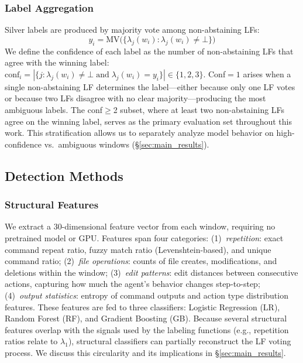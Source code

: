 \subsubsection{Label Aggregation}
\label{sec:label_aggregation}

Silver labels are produced by majority vote among non-abstaining LFs:
\begin{equation}
y_i = \text{MV}\bigl(\{\lambda_j(w_i) : \lambda_j(w_i) \neq \bot\}\bigr)
\label{eq:mv}
\end{equation}
We define the confidence of each label as the number of non-abstaining LFs that agree with the winning label: $\text{conf}_i = |\{j : \lambda_j(w_i) \neq \bot \;\text{and}\; \lambda_j(w_i) = y_i\}| \in \{1, 2, 3\}$.
Conf${=}1$ arises when a single non-abstaining LF determines the label---either because only one LF votes or because two LFs disagree with no clear majority---producing the most ambiguous labels.
The conf${\geq}$2 subset, where at least two non-abstaining LFs agree on the winning label, serves as the primary evaluation set throughout this work.
This stratification allows us to separately analyze model behavior on high-confidence vs.\ ambiguous windows (\S\ref{sec:main_results}).

\subsection{Detection Methods}
\label{sec:detection_methods}

\subsubsection{Structural Features}
\label{sec:structural_features}

We extract a 30-dimensional feature vector from each window, requiring no pretrained model or GPU.
Features span four categories:
(1)~\emph{repetition}: exact command repeat ratio, fuzzy match ratio (Levenshtein-based), and unique command ratio;
(2)~\emph{file operations}: counts of file creates, modifications, and deletions within the window;
(3)~\emph{edit patterns}: edit distances between consecutive actions, capturing how much the agent's behavior changes step-to-step;
(4)~\emph{output statistics}: entropy of command outputs and action type distribution features.
These features are fed to three classifiers: Logistic Regression (LR), Random Forest (RF), and Gradient Boosting (GB).
Because several structural features overlap with the signals used by the labeling functions (e.g., repetition ratios relate to $\lambda_1$), structural classifiers can partially reconstruct the LF voting process.
We discuss this circularity and its implications in \S\ref{sec:main_results}.

